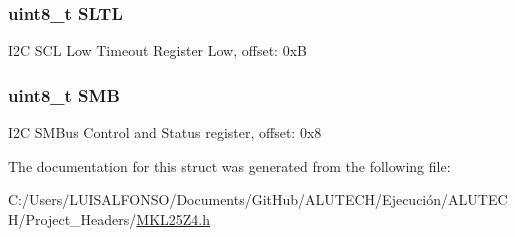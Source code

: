 \subsubsection[{S\+L\+T\+L}]{\setlength{\rightskip}{0pt plus 5cm}uint8\+\_\+t S\+L\+T\+L}\label{struct_i2_c___mem_map_afde3b60c25d0b8c0534a047e42c661f8}
I2\+C S\+C\+L Low Timeout Register Low, offset\+: 0x\+B \hypertarget{struct_i2_c___mem_map_a68e3b8db845208e127d029a687f96707}{}
\subsubsection[{S\+M\+B}]{\setlength{\rightskip}{0pt plus 5cm}uint8\+\_\+t S\+M\+B}\label{struct_i2_c___mem_map_a68e3b8db845208e127d029a687f96707}
I2\+C S\+M\+Bus Control and Status register, offset\+: 0x8 

The documentation for this struct was generated from the following file\+:\begin{DoxyCompactItemize}
\item 
C\+:/\+Users/\+L\+U\+I\+S\+A\+L\+F\+O\+N\+S\+O/\+Documents/\+Git\+Hub/\+A\+L\+U\+T\+E\+C\+H/\+Ejecución/\+A\+L\+U\+T\+E\+C\+H/\+Project\+\_\+\+Headers/\hyperlink{_m_k_l25_z4_8h}{M\+K\+L25\+Z4.\+h}\end{DoxyCompactItemize}
